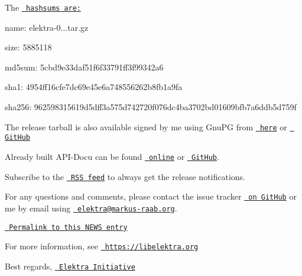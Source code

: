 The \href{https://github.com/ElektraInitiative/ftp/blob/master/releases/elektra-0.8.22.tar.gz.hashsum?raw=true}{\texttt{ hashsums are\+:}}


\begin{DoxyItemize}
\item name\+: elektra-\/0...\+tar.\+gz
\item size\+: 5885118
\item md5sum\+: 5cbd9e33daf51f6f33791ff3f99342a6
\item sha1\+: 4954ff16cfe7dc69e45e6a748556262b8fb1a9fa
\item sha256\+: 962598315619d5dff3a575d742720f076dc4ba3702bd01609bfb7a6ddb5d759f
\end{DoxyItemize}

The release tarball is also available signed by me using Gnu\+PG from \href{https://www.libelektra.org/ftp/elektra/releases/elektra-0.8.22.tar.gz.gpg}{\texttt{ here}} or \href{https://github.com/ElektraInitiative/ftp/blob/master/releases//elektra-0.8.22.tar.gz.gpg?raw=true}{\texttt{ Git\+Hub}}

Already built A\+P\+I-\/\+Docu can be found \href{https://doc.libelektra.org/api/0.8.22/html/}{\texttt{ online}} or \href{https://github.com/ElektraInitiative/doc/tree/master/api/0.8.22}{\texttt{ Git\+Hub}}.

Subscribe to the \href{https://www.libelektra.org/news/feed.rss}{\texttt{ R\+SS feed}} to always get the release notifications.

For any questions and comments, please contact the issue tracker \href{http://issues.libelektra.org}{\texttt{ on Git\+Hub}} or me by email using \href{mailto:elektra@markus-raab.org}{\texttt{ elektra@markus-\/raab.\+org}}.

\href{https://www.libelektra.org/news/0.8.22-release}{\texttt{ Permalink to this N\+E\+WS entry}}

For more information, see \href{https://libelektra.org}{\texttt{ https\+://libelektra.\+org}}

Best regards, \href{https://www.libelektra.org/developers/authors}{\texttt{ Elektra Initiative}} 